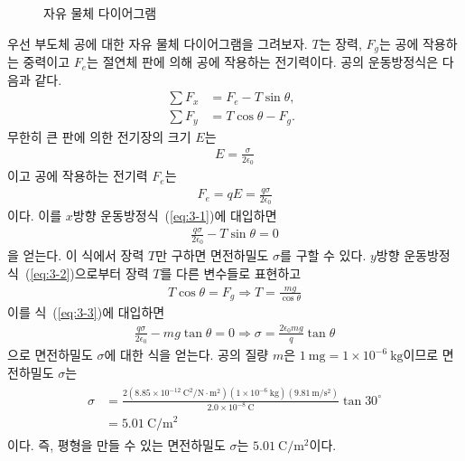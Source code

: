 \documentclass[tightenlines,floatfix,nofootinbib,superscriptaddress,fleqn]{revtex4-2}
\begin{document}
\begin{figure}
   \caption{자유 물체 다이어그램}
\end{figure}

우선 부도체 공에 대한 자유 물체 다이어그램을 그려보자.
$T$는 장력, $F_g$는 공에 작용하는 중력이고 $F_e$는 절연체 판에 의해 공에 작용하는 
전기력이다. 공의 운동방정식은 다음과 같다.
\begin{align}
  \label{eq:3-1}\sum F_x &= F_e - T\sin\theta  ,\,\,\, \\
  \label{eq:3-2}\sum F_y &= T\cos\theta - F_g.
\end{align}
무한히 큰 판에 의한 전기장의 크기 $E$는
\begin{align}
  E=\frac{\sigma}{2\epsilon_0}
\end{align}
이고 공에 작용하는 전기력 $F_e$는
\begin{align}
  F_e = qE = \frac{q\sigma}{2\epsilon_0}
\end{align}
이다. 이를 $x$방향 운동방정식~(\ref{eq:3-1})에 대입하면
\begin{align}\label{eq:3-3}
  \frac{q\sigma}{2\epsilon_0}-T\sin\theta=0
\end{align}
을 얻는다. 이 식에서 장력 $T$만 구하면 면전하밀도 $\sigma$를 구할 수 있다. 
$y$방향 운동방정식~(\ref{eq:3-2})으로부터 장력 $T$를 다른 변수들로 표현하고
\begin{align}
  T\cos\theta = F_g \Longrightarrow T=\frac{mg}{\cos\theta}
\end{align}
이를 식~(\ref{eq:3-3})에 대입하면
\begin{align}
  \frac{q\sigma}{2\epsilon_0}-mg\tan\theta=0  \Longrightarrow
  \sigma = \frac{2\epsilon_0mg}{q}\tan\theta
\end{align}
으로 면전하밀도 $\sigma$에 대한 식을 얻는다. 공의 질량 $m$은 $1~\mathrm{mg}
=1\times 10^{-6}~\mathrm{kg}$이므로 면전하밀도 $\sigma$는
\begin{align}
  \begin{split}
    \sigma &= \frac{2(8.85\times 10^{-12}~\mathrm{C^2/N\cdot m^{2}})
    (1\times 10^{-6}~\mathrm{kg})
    (9.81~\mathrm{m/s^2})}
    {2.0\times 10^{-8}~\mathrm{C}}\tan 30^\circ \\
    &= 5.01~\mathrm{C/m^2}
  \end{split}
\end{align}
이다. 즉, 평형을 만들 수 있는 면전하밀도 $\sigma$는 $5.01~\mathrm{C/m^2}$이다.
\vspace{0.5cm}
\end{document}
